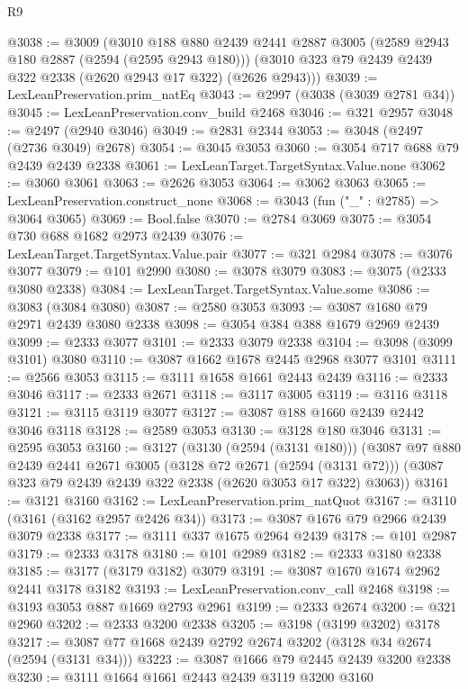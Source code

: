 \begin{lexlean}{R9}
\begin{coremodule}
@3038 := @3009
    (@3010
      @188
      @880
      @2439
      @2441
      @2887
      @3005
      (@2589 @2943 @180 @2887 (@2594 (@2595 @2943 @180)))
      (@3010 @323 @79 @2439 @2439 @322 @2338 (@2620 @2943 @17 @322) (@2626 @2943)))
@3039 := LexLeanPreservation.prim_natEq
@3043 := @2997 (@3038 (@3039 @2781 @34))
@3045 := LexLeanPreservation.conv_build @2468
@3046 := @321 @2957
@3048 := @2497 (@2940 @3046)
@3049 := @2831 @2344
@3053 := @3048 (@2497 (@2736 @3049) @2678)
@3054 := @3045 @3053
@3060 := @3054 @717 @688 @79 @2439 @2439 @2338
@3061 := LexLeanTarget.TargetSyntax.Value.none
@3062 := @3060 @3061
@3063 := @2626 @3053
@3064 := @3062 @3063
@3065 := LexLeanPreservation.construct_none
@3068 := @3043 (fun ("_" : @2785) => @3064 @3065)
@3069 := Bool.false
@3070 := @2784 @3069
@3075 := @3054 @730 @688 @1682 @2973 @2439
@3076 := LexLeanTarget.TargetSyntax.Value.pair
@3077 := @321 @2984
@3078 := @3076 @3077
@3079 := @101 @2990
@3080 := @3078 @3079
@3083 := @3075 (@2333 @3080 @2338)
@3084 := LexLeanTarget.TargetSyntax.Value.some
@3086 := @3083 (@3084 @3080)
@3087 := @2580 @3053
@3093 := @3087 @1680 @79 @2971 @2439 @3080 @2338
@3098 := @3054 @384 @388 @1679 @2969 @2439
@3099 := @2333 @3077
@3101 := @2333 @3079 @2338
@3104 := @3098 (@3099 @3101) @3080
@3110 := @3087 @1662 @1678 @2445 @2968 @3077 @3101
@3111 := @2566 @3053
@3115 := @3111 @1658 @1661 @2443 @2439
@3116 := @2333 @3046
@3117 := @2333 @2671
@3118 := @3117 @3005
@3119 := @3116 @3118
@3121 := @3115 @3119 @3077
@3127 := @3087 @188 @1660 @2439 @2442 @3046 @3118
@3128 := @2589 @3053
@3130 := @3128 @180 @3046
@3131 := @2595 @3053
@3160 := @3127
    (@3130 (@2594 (@3131 @180)))
    (@3087
      @97
      @880
      @2439
      @2441
      @2671
      @3005
      (@3128 @72 @2671 (@2594 (@3131 @72)))
      (@3087 @323 @79 @2439 @2439 @322 @2338 (@2620 @3053 @17 @322) @3063))
@3161 := @3121 @3160
@3162 := LexLeanPreservation.prim_natQuot
@3167 := @3110 (@3161 (@3162 @2957 @2426 @34))
@3173 := @3087 @1676 @79 @2966 @2439 @3079 @2338
@3177 := @3111 @337 @1675 @2964 @2439
@3178 := @101 @2987
@3179 := @2333 @3178
@3180 := @101 @2989
@3182 := @2333 @3180 @2338
@3185 := @3177 (@3179 @3182) @3079
@3191 := @3087 @1670 @1674 @2962 @2441 @3178 @3182
@3193 := LexLeanPreservation.conv_call @2468
@3198 := @3193 @3053 @887 @1669 @2793 @2961
@3199 := @2333 @2674
@3200 := @321 @2960
@3202 := @2333 @3200 @2338
@3205 := @3198 (@3199 @3202) @3178
@3217 := @3087 @77 @1668 @2439 @2792 @2674 @3202 (@3128 @34 @2674 (@2594 (@3131 @34)))
@3223 := @3087 @1666 @79 @2445 @2439 @3200 @2338
@3230 := @3111 @1664 @1661 @2443 @2439 @3119 @3200 @3160

\end{coremodule}
\end{lexlean}
